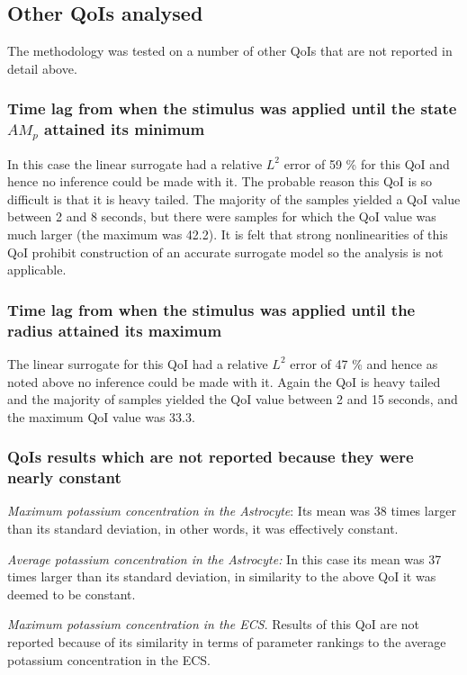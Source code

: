 \subsection{Other QoIs analysed}

The methodology was tested on a number of other QoIs that are not reported in detail above. 
\subsubsection{Time lag from when the stimulus was applied until the state $AM_p$ attained its minimum} In this case the linear surrogate had a relative $L^2$ error of 59 \% for this QoI and hence no inference could be made with it. The probable reason this QoI is so difficult is that it is heavy tailed. The majority of the samples yielded a QoI value between 2 and 8 seconds, but there were samples for which the QoI value was much larger (the maximum was 42.2). It is felt that strong nonlinearities of this QoI prohibit construction of an accurate surrogate model so the analysis is not applicable.

\subsubsection{Time lag from when the stimulus was applied until the radius attained its maximum} The linear surrogate for this QoI had a relative $L^2$ error of 47 \% and hence as noted above no inference could be made with it. Again the QoI  is heavy tailed and the majority of samples yielded the QoI value between 2 and 15 seconds, and the maximum QoI value was 33.3. 

\subsubsection{QoIs results which are not reported because they were nearly constant}

\textit{Maximum potassium concentration in the Astrocyte}: Its mean was 38 times larger than its standard deviation, in other words, it was effectively constant.

\textit{Average potassium concentration in the Astrocyte:} In this case its mean was 37 times larger than its standard deviation, in similarity to the above QoI it was deemed to be  constant.


\textit{Maximum potassium concentration in the ECS}. Results of this QoI are not reported because of its similarity in terms of parameter rankings to the average potassium concentration in the ECS. 

